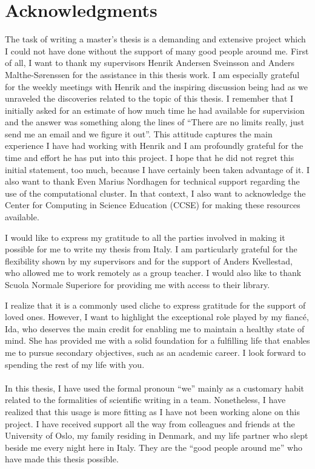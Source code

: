 \chapter*{Acknowledgments}
The task of writing a master's thesis is a demanding and extensive project which
I could not have done without the support of many good people around me. First
of all, I want to thank my supervisors Henrik Andersen Sveinsson and Anders
Malthe-Sørenssen for the assistance in this thesis work. I am especially
grateful for the weekly meetings with Henrik and the inspiring discussion being
had as we unraveled the discoveries related to the topic of this thesis. I
remember that I initially asked for an estimate of how much time he had
available for supervision and the answer was something along the lines of
``There are no limits really, just send me an email and we figure it out''. This
attitude captures the main experience I have had working with Henrik and I am
profoundly grateful for the time and effort he has put into this project. I
hope that he did not regret this initial statement, too much, because I have
certainly been taken advantage of it. I also want to thank Even Marius Nordhagen
for technical support regarding the use of the computational cluster. In that
context, I also want to acknowledge the Center for Computing in Science
Education (CCSE) for making these resources available. 

I would like to express my gratitude to all the parties involved in making it
possible for me to write my thesis from Italy. I am particularly grateful for
the flexibility shown by my supervisors and for the support of Anders
Kvellestad, who allowed me to work remotely as a group teacher. I would also
like to thank Scuola Normale Superiore for providing me with access to their
library.

I realize that it is a commonly used cliche to express gratitude for the support
of loved ones. However, I want to highlight the exceptional role played by my
fiancé, Ida, who deserves the main credit for enabling me to maintain a healthy
state of mind. She has provided me with a solid foundation for a fulfilling life
that enables me to pursue secondary objectives, such as an academic career. I
look forward to spending the rest of my life with you. \\
\\
In this thesis, I have used the formal pronoun ``we'' mainly as a customary
habit related to the formalities of scientific writing in a team. Nonetheless, I
have realized that this usage is more fitting as I have not been working alone
on this project. I have received support all the way from colleagues and friends
at the University of Oslo, my family residing in Denmark, and my life partner who slept beside me every night here in Italy. They are the ``good people
around me'' who have made this thesis possible.





